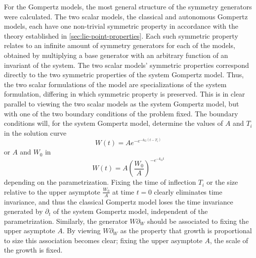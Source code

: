 For the Gompertz models, the most general structure of the symmetry generators were calculated.
The two scalar models, the classical and autonomous Gompertz models, each have one non-trivial symmetric property in accordance with the theory established in \cref{sec:lie-point-properties}.
Each such symmetric property relates to an infinite amount of symmetry generators for each of the models, obtained by multiplying a base generator with an arbitrary function of an invariant of the system.
The two scalar models' symmetric properties correspond directly to the two symmetric properties of the system Gompertz model.
Thus, the two scalar formulations of the model are specializations of the system formulation, differing in which symmetric property is preserved.
This is in clear parallel to viewing the two scalar models as the system Gompertz model, but with one of the two boundary conditions of the problem fixed.
The boundary conditions will, for the system Gompertz model, determine the values of \(A\) and \(T_i\) in the solution curve
\begin{equation*}
  W(t) = A e^{-e^{-k_G(t-T_i)}}
\end{equation*}
or \(A\) and \(W_0\) in
\begin{equation*}
  W(t) = A \left(\frac{W_0}{A}\right)^{-e^{-k_G t}}
\end{equation*}
depending on the parametrization.
Fixing the time of inflection \(T_i\) or the size relative to the upper asymptote \(\frac{W_0}{A}\) at time \(t = 0\) clearly eliminates time invariance, and thus the classical Gompertz model loses the time invariance generated by \(\partial_t\) of the system Gompertz model, independent of the parametrization.
Similarly, the generator \(W \partial_W\) should be associated to fixing the upper asymptote \(A\).
By viewing \(W \partial_W\) as the property that growth is proportional to size this association becomes clear; fixing the upper asymptote \(A\), the scale of the growth is fixed.

